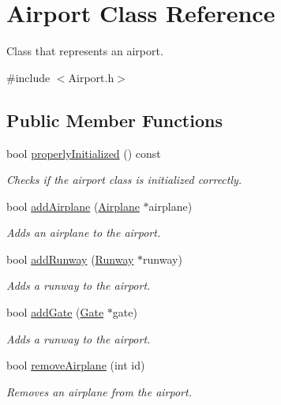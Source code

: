 \hypertarget{class_airport}{}\section{Airport Class Reference}
\label{class_airport}


Class that represents an airport.  




{\ttfamily \#include $<$Airport.\+h$>$}

\subsection*{Public Member Functions}
\begin{DoxyCompactItemize}
\item 
bool \mbox{\hyperlink{class_airport_aa13e68ac58e8875837fbe888325cfff6}{properly\+Initialized}} () const
\begin{DoxyCompactList}\small\item\em Checks if the airport class is initialized correctly. \end{DoxyCompactList}\item 
bool \mbox{\hyperlink{class_airport_a1862d996ae21c60e86f52a49628a27ff}{add\+Airplane}} (\mbox{\hyperlink{class_airplane}{Airplane}} $\ast$airplane)
\begin{DoxyCompactList}\small\item\em Adds an airplane to the airport. \end{DoxyCompactList}\item 
bool \mbox{\hyperlink{class_airport_a8e8c8a80b3726c1dda7408e90469b9e7}{add\+Runway}} (\mbox{\hyperlink{class_runway}{Runway}} $\ast$runway)
\begin{DoxyCompactList}\small\item\em Adds a runway to the airport. \end{DoxyCompactList}\item 
bool \mbox{\hyperlink{class_airport_a261e0c60f7e788de20ea902cb09b4569}{add\+Gate}} (\mbox{\hyperlink{class_gate}{Gate}} $\ast$gate)
\begin{DoxyCompactList}\small\item\em Adds a runway to the airport. \end{DoxyCompactList}\item 
bool \mbox{\hyperlink{class_airport_a4e4929a17d410aac86d2d518648e4284}{remove\+Airplane}} (int id)
\begin{DoxyCompactList}\small\item\em Removes an airplane from the airport. \end{DoxyCompactList}\item 

\end{DoxyCompactItemize}
